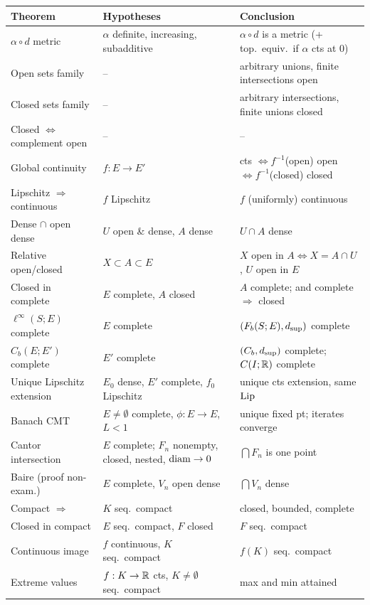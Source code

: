 \begin{center}
\renewcommand{\arraystretch}{1.25}
\begin{longtable}{@{}p{4.3cm}p{6.2cm}p{5.5cm}@{}}\toprule
Theorem & Hypotheses & Conclusion\\\midrule
$\alpha\circ d$ metric & $\alpha$ definite, increasing, subadditive & $\alpha\circ d$ is a metric (+ top.\ equiv.\ if $\alpha$ cts at $0$)\\
Open sets family & -- & arbitrary unions, finite intersections open\\
Closed sets family & -- & arbitrary intersections, finite unions closed\\
Closed $\iff$ complement open & -- & --\\
Global continuity & $f:E\to E'$ & cts $\iff f^{-1}$(open) open $\iff f^{-1}$(closed) closed\\
Lipschitz $\Rightarrow$ continuous & $f$ Lipschitz & $f$ (uniformly) continuous\\
Dense $\cap$ open dense & $U$ open \& dense, $A$ dense & $U\cap A$ dense\\
Relative open/closed & $X\subset A\subset E$ & $X$ open in $A\iff X=A\cap U$, $U$ open in $E$\\
Closed in complete & $E$ complete, $A$ closed & $A$ complete; and complete $\Rightarrow$ closed\\
$\ell^\infty(S;E)$ complete & $E$ complete & $(F_b(S;E),d_{\sup})$ complete\\
$C_b(E;E')$ complete & $E'$ complete & $(C_b,d_{\sup})$ complete; $C(I;\mathbb R)$ complete\\
Unique Lipschitz extension & $E_0$ dense, $E'$ complete, $f_0$ Lipschitz & unique cts extension, same $\operatorname{Lip}$\\
Banach CMT & $E\ne\emptyset$ complete, $\phi:E\to E$, $L<1$ & unique fixed pt; iterates converge\\
Cantor intersection & $E$ complete; $F_n$ nonempty, closed, nested, $\operatorname{diam}\to0$ & $\bigcap F_n$ is one point\\
Baire (proof non-exam.) & $E$ complete, $V_n$ open dense & $\bigcap V_n$ dense\\
Compact $\Rightarrow$ & $K$ seq.\ compact & closed, bounded, complete\\
Closed in compact & $E$ seq.\ compact, $F$ closed & $F$ seq.\ compact\\
Continuous image & $f$ continuous, $K$ seq.\ compact & $f(K)$ seq.\ compact\\
Extreme values & $f:K\to\mathbb R$ cts, $K\ne\emptyset$ seq.\ compact & max and min attained\\

\end{longtable}
\end{center}
